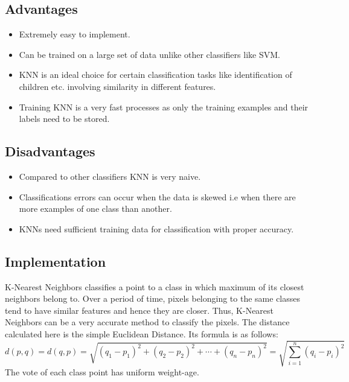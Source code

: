 \documentclass[12pt, a4paper]{report}
\begin{document}
\subsection{Advantages}
\begin{itemize}
\item Extremely easy to implement.
\item Can be trained on a large set of data unlike other classifiers like SVM.
\item KNN is an ideal choice for certain classification tasks like identification of children etc. involving similarity in different features.
\item Training KNN is a very fast processes as only the training examples and their labels need to be stored.
\end{itemize}

\subsection{Disadvantages}
\begin{itemize}
\item Compared to other classifiers KNN is very naive.
\item Classifications errors can occur when the data is skewed i.e when there are more examples of one class than another.
\item KNNs need sufficient training data for classification with proper accuracy.
\end{itemize}

\subsection{Implementation}
K-Nearest Neighbors  classifies a point to a class in which maximum of its closest neighbors belong to. Over a period of time, pixels belonging to the same classes tend to have similar features and hence they are closer. Thus, K-Nearest Neighbors can be a very accurate method to classify the pixels. The distance calculated here is the simple Euclidean Distance. Its formula is as follows:
\begin{displaymath}
d(p, q)=d(q, p)=\sqrt{(q_1-p_1)^2+(q_2-p_2)^2+\cdots+(q_n-p_n)^2}=\sqrt{\sum_{i=1}^{n}(q_i-p_i)^2}
\end{displaymath}
The vote of each class point has uniform weight-age.
\end{document}
